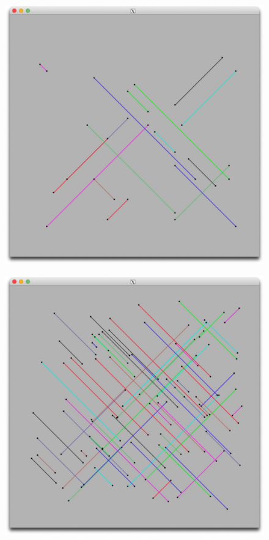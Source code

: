 \documentclass[letterpaper,11pt]{exam}
\begin{document}
\begin{figure}[h]
    \begin{minipage}{0.3\textwidth}
        \centering
        \includegraphics[width=\textwidth]{img/circuit_32x32_16.jpg}
        \label{fig:question1b}
    \end{minipage}
    \hspace{0.2cm}
    \begin{minipage}{0.3\textwidth}
        \centering
        \includegraphics[width=\textwidth]{img/circuit_256x256_64.jpg}

\end{minipage}
\end{figure}
\end{document}
